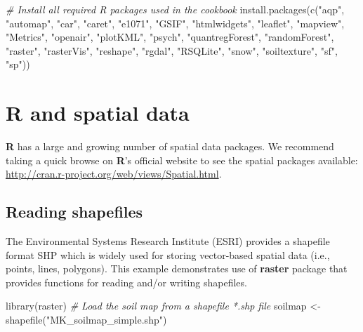 \documentclass[
  10pt,
  b5paper,
  oneside]{book}
\newenvironment{Shaded}{\begin{snugshade}}{\end{snugshade}}
\newcommand{\CommentTok}[1]{\textcolor[rgb]{0.56,0.35,0.01}{\textit{#1}}}
\newcommand{\FunctionTok}[1]{\textcolor[rgb]{0.00,0.00,0.00}{#1}}
\newcommand{\NormalTok}[1]{#1}
\newcommand{\OtherTok}[1]{\textcolor[rgb]{0.56,0.35,0.01}{#1}}
\newcommand{\StringTok}[1]{\textcolor[rgb]{0.31,0.60,0.02}{#1}}
\theoremstyle{definition}
\theoremstyle{definition}
\theoremstyle{definition}
\theoremstyle{definition}
\theoremstyle{remark}
\begin{document}
\begin{Shaded}
\begin{Highlighting}[]
\CommentTok{\# Install all required R packages used in the cookbook}
\FunctionTok{install.packages}\NormalTok{(}\FunctionTok{c}\NormalTok{(}\StringTok{"aqp"}\NormalTok{, }\StringTok{"automap"}\NormalTok{, }\StringTok{"car"}\NormalTok{, }\StringTok{"caret"}\NormalTok{, }\StringTok{"e1071"}\NormalTok{,}
                   \StringTok{"GSIF"}\NormalTok{, }\StringTok{"htmlwidgets"}\NormalTok{, }\StringTok{"leaflet"}\NormalTok{, }\StringTok{"mapview"}\NormalTok{,}
                   \StringTok{"Metrics"}\NormalTok{, }\StringTok{"openair"}\NormalTok{, }\StringTok{"plotKML"}\NormalTok{, }\StringTok{"psych"}\NormalTok{, }
                   \StringTok{"quantregForest"}\NormalTok{, }\StringTok{"randomForest"}\NormalTok{, }\StringTok{"raster"}\NormalTok{,}
                   \StringTok{"rasterVis"}\NormalTok{, }\StringTok{"reshape"}\NormalTok{, }\StringTok{"rgdal"}\NormalTok{, }\StringTok{"RSQLite"}\NormalTok{,}
                   \StringTok{"snow"}\NormalTok{, }\StringTok{"soiltexture"}\NormalTok{, }\StringTok{"sf"}\NormalTok{, }\StringTok{"sp"}\NormalTok{))}
\end{Highlighting}
\end{Shaded}

\hypertarget{r-and-spatial-data}{%
\section{R and spatial data}\label{r-and-spatial-data}}

\textbf{R} has a large and growing number of spatial data packages. We recommend taking a quick browse on \textbf{R}'s official website to see the spatial packages available: \url{http://cran.r-project.org/web/views/Spatial.html}.

\hypertarget{reading-shapefiles}{%
\subsection{Reading shapefiles}\label{reading-shapefiles}}

The Environmental Systems Research Institute (ESRI) provides a shapefile format SHP which is widely used for storing vector-based spatial data (i.e., points, lines, polygons). This example demonstrates use of \textbf{raster} package that provides functions for reading and/or writing shapefiles.

\begin{Shaded}
\begin{Highlighting}[]
\FunctionTok{library}\NormalTok{(raster)}
\CommentTok{\# Load the soil map from a shapefile *.shp file}
\NormalTok{soilmap }\OtherTok{\textless{}{-}} \FunctionTok{shapefile}\NormalTok{(}\StringTok{"MK\_soilmap\_simple.shp"}\NormalTok{)}
\end{Highlighting}
\end{Shaded}
\end{document}
